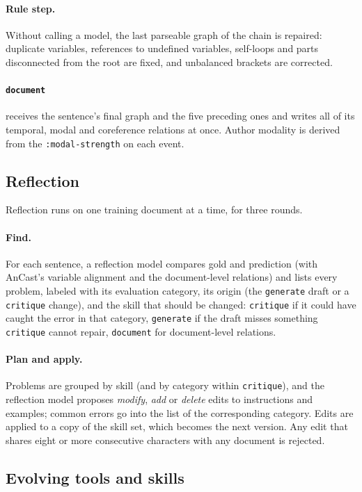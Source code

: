 \documentclass[11pt]{article}
\newcommand{\skill}[1]{\texttt{#1}}
\begin{document}
\paragraph{Rule step.} Without calling a model, the last parseable graph of the chain is repaired: duplicate variables, references to undefined variables, self-loops and parts disconnected from the root are fixed, and unbalanced brackets are corrected.

\paragraph{\skill{document}} receives the sentence's final graph and the five preceding ones and writes all of its temporal, modal and coreference relations at once. Author modality is derived from the \texttt{:modal-strength} on each event.

\subsection{Reflection}

Reflection runs on one training document at a time, for three rounds.

\paragraph{Find.} For each sentence, a reflection model compares gold and prediction (with AnCast's variable alignment and the document-level relations) and lists every problem, labeled with its evaluation category, its origin (the \skill{generate} draft or a \skill{critique} change), and the skill that should be changed: \skill{critique} if it could have caught the error in that category, \skill{generate} if the draft misses something \skill{critique} cannot repair, \skill{document} for document-level relations.

\paragraph{Plan and apply.} Problems are grouped by skill (and by category within \skill{critique}), and the reflection model proposes \emph{modify}, \emph{add} or \emph{delete} edits to instructions and examples; common errors go into the list of the corresponding category. Edits are applied to a copy of the skill set, which becomes the next version. Any edit that shares eight or more consecutive characters with any document is rejected.

\subsection{Evolving tools and skills}
\end{document}
